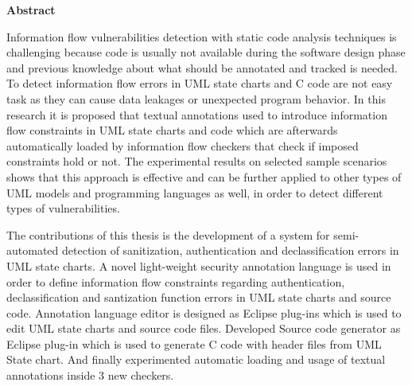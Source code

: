 

\clearemptydoublepage
{}
{}	





\vspace*{2cm}
\begin{center}
{\Large \bf Abstract}
\end{center}
\vspace{1cm}

Information flow vulnerabilities detection with static code analysis techniques is challenging because code
is usually not available during the software design phase and
previous knowledge about what should be annotated and tracked
is needed. To detect information flow errors in UML state
charts and C code are not easy task as they can cause data leakages or unexpected program behavior. In this research it is proposed that textual annotations used to
introduce information flow constraints in UML state charts and code which are afterwards automatically loaded by information flow checkers that check if imposed constraints hold or not. The experimental results on selected sample scenarios shows that this approach
is effective and can be further applied to other types of UML
models and programming languages as well, in order to detect
different types of vulnerabilities.

The contributions of this thesis is the development of a system for semi-automated detection of sanitization, authentication and declassification errors in UML state charts. A novel light-weight security annotation language is
used in order to define information flow constraints regarding authentication, declassification and santization function errors  in UML state charts and source code.  Annotation language editor is designed as Eclipse
plug-ins which is used to edit UML state charts and
source code files. Developed Source code generator as Eclipse plug-in which is used to generate C code with header files from UML State chart. And finally experimented automatic loading and usage of textual annotations
inside 3 new checkers.